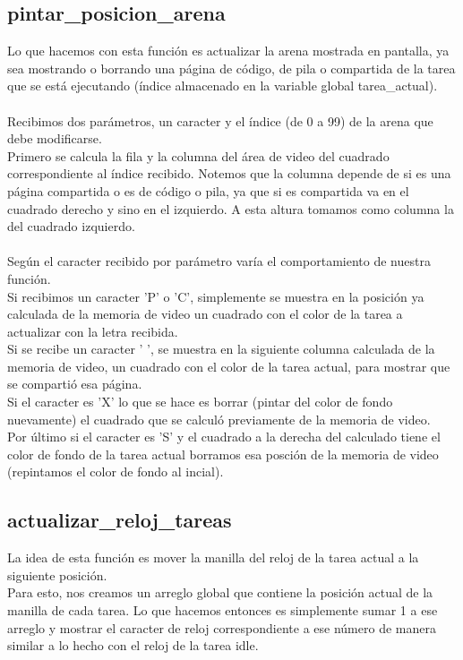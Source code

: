 \subsection{pintar\_posicion\_arena}
Lo que hacemos con esta función es actualizar la arena mostrada en pantalla, ya sea mostrando o borrando una página de código, de pila o compartida 
de la tarea que se está ejecutando (índice almacenado en la variable global tarea\_actual).\\
\\
Recibimos dos parámetros, un caracter y el índice (de 0 a 99) de la arena que debe modificarse.\\
Primero se calcula la fila y la columna del área de video del cuadrado correspondiente al índice recibido.
Notemos que la columna depende de si es una página compartida o es de código o pila, ya que si es compartida va en el cuadrado derecho y sino en el izquierdo.
A esta altura tomamos como columna la del cuadrado izquierdo.\\
\\
Según el caracter recibido por parámetro varía el comportamiento de nuestra función.\\
Si recibimos un caracter 'P' o 'C', simplemente se muestra en la posición ya calculada de la memoria de video un cuadrado con el color de la tarea a actualizar
con la letra recibida.\\
Si se recibe un caracter ' ', se muestra en la siguiente columna calculada de la memoria de video, un cuadrado con el color de la tarea actual, para mostrar
que se compartió esa página.\\
Si el caracter es 'X' lo que se hace es borrar (pintar del color de fondo nuevamente) el cuadrado que se calculó previamente de la memoria de video.\\
Por último si el caracter es 'S' y el cuadrado a la derecha del calculado tiene el color de fondo de la tarea actual borramos esa posción de la memoria de video (repintamos el color de fondo al incial).

\subsection{actualizar\_reloj\_tareas}
La idea de esta función es mover la manilla del reloj de la tarea actual a la siguiente posición.\\
Para esto, nos creamos un arreglo global que contiene la posición actual de la manilla de cada tarea. Lo que hacemos entonces es simplemente sumar 1 a ese arreglo y mostrar el caracter de reloj correspondiente a ese número de manera similar a lo hecho con el reloj de la tarea idle.
